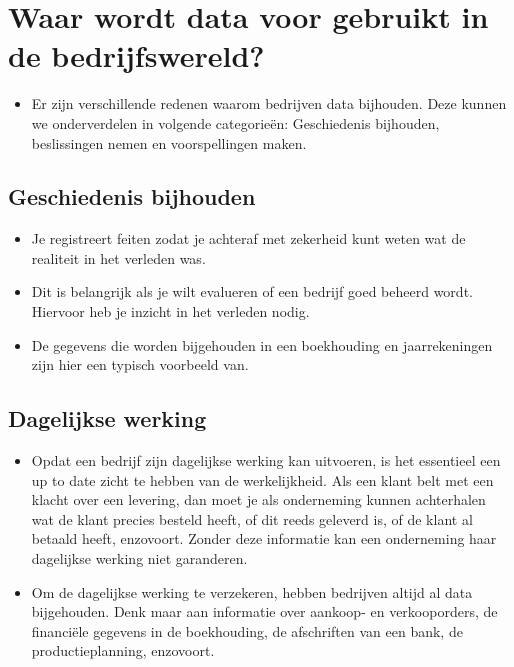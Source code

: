 \documentclass[]{memoir}
\providecommand{\tightlist}{%
  \setlength{\itemsep}{0pt}\setlength{\parskip}{0pt}}
\begin{document}
\hypertarget{waar-wordt-data-voor-gebruikt-in-de-bedrijfswereld}{%
\section{Waar wordt data voor gebruikt in de bedrijfswereld?}\label{waar-wordt-data-voor-gebruikt-in-de-bedrijfswereld}}

\begin{itemize}
\tightlist
\item
  Er zijn verschillende redenen waarom bedrijven data bijhouden. Deze kunnen we onderverdelen in volgende categorieën: Geschiedenis bijhouden, beslissingen nemen en voorspellingen maken.
\end{itemize}

\hypertarget{geschiedenis-bijhouden}{%
\subsection*{Geschiedenis bijhouden}\label{geschiedenis-bijhouden}}

\begin{itemize}
\tightlist
\item
  Je registreert feiten zodat je achteraf met zekerheid kunt weten wat de realiteit in het verleden was.
\item
  Dit is belangrijk als je wilt evalueren of een bedrijf goed beheerd wordt. Hiervoor heb je inzicht in het verleden nodig.
\item
  De gegevens die worden bijgehouden in een boekhouding en jaarrekeningen zijn hier een typisch voorbeeld van.
\end{itemize}

\hypertarget{dagelijkse-werking}{%
\subsection*{Dagelijkse werking}\label{dagelijkse-werking}}

\begin{itemize}
\tightlist
\item
  Opdat een bedrijf zijn dagelijkse werking kan uitvoeren, is het essentieel een up to date zicht te hebben van de werkelijkheid. Als een klant belt met een klacht over een levering, dan moet je als onderneming kunnen achterhalen wat de klant precies besteld heeft, of dit reeds geleverd is, of de klant al betaald heeft, enzovoort. Zonder deze informatie kan een onderneming haar dagelijkse werking niet garanderen.
\item
  Om de dagelijkse werking te verzekeren, hebben bedrijven altijd al data bijgehouden. Denk maar aan informatie over aankoop- en verkooporders, de financiële gegevens in de boekhouding, de afschriften van een bank, de productieplanning, enzovoort.
\end{itemize}
\end{document}
